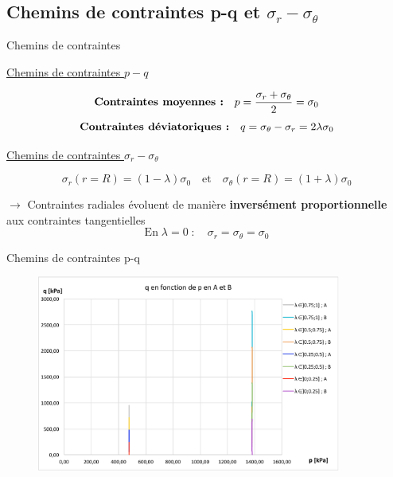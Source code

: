 \documentclass{beamer}
\begin{document}






\subsection{Chemins de contraintes p-q et $\sigma_r - \sigma_{\theta}$}



\begin{frame}{Chemins de contraintes}
  
\underline{Chemins de contraintes $p-q$}  

    \[\text{\textbf{Contraintes moyennes :}}\quad  p = \dfrac{\sigma_r + \sigma_{\theta}}{2}=\sigma_0\]
    \[\text{\textbf{Contraintes déviatoriques :}}\quad q=\sigma_{\theta} - \sigma_r=2\lambda\sigma_0\]

\vspace{0,5cm}
\underline{Chemins de contraintes $\sigma_r - \sigma_{\theta}$}      
   
    \[\sigma_r(r=R) = \left( 1 - \lambda \right) \sigma_0\quad \text{et}\quad \sigma_{\theta}(r=R) = \left( 1 + \lambda \right) \sigma_0\]
      
    $\rightarrow$ Contraintes radiales évoluent de manière \textbf{inversément proportionnelle} aux contraintes tangentielles\\
      
    \[\text{En}\;\lambda=0\;:\quad\sigma_r=\sigma_{\theta}=\sigma_0\]

\end{frame} 


\begin{frame}{Chemins de contraintes p-q}

\begin{figure}
\centering
\includegraphics[width=10cm]{pq.pdf}
\end{figure}
    
\end{frame}
\end{document}
